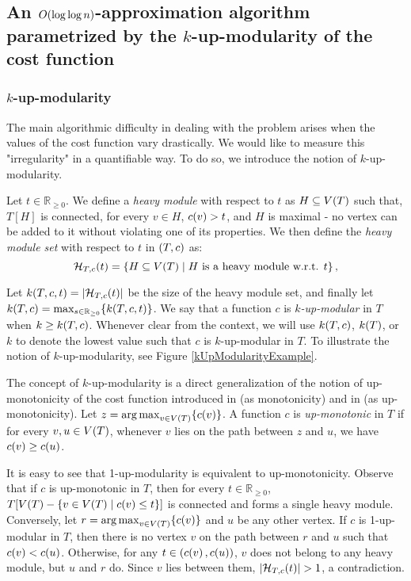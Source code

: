 

\subsection{An $O\mathopen{}\left( \log\log n \right)$-approximation algorithm parametrized by the $k$-up-modularity of the cost function}
\subsubsection{$k$-up-modularity}\label{kUpModularity}
The main algorithmic difficulty in dealing with the problem arises when the values of the cost function vary drastically. We would like to measure this "irregularity" in a quantifiable way. To do so, we introduce the notion of $k$-up-modularity.


Let $t\in\mathbb{R}_{\geq0}$. We define a \textit{heavy module} with respect to $t$ as $H\subseteq V\mathopen{}\left( T \right)$ such that, $T[H]$ is connected, for every $v \in H$, $c\mathopen{}\left( v \right) > t$, and $H$ is maximal - no vertex can be added to it without violating one of its properties. We then define the \textit{heavy module set} with respect to $t$ in $\mathopen{}\left( T,c \right)$ as:
$$
\mathcal{H}_{T,c}\mathopen{}\left( t \right)=\mathopen{}\left\{ H\subseteq V\mathopen{}\left( T \right)\mid H \text{ is a heavy module w.r.t. } t \right\},
$$

Let $k\mathopen{}\left( T,c, t \right) = \mathopen{}\left| \mathcal{H}_{T,c}\mathopen{}\left( t \right) \right|$ be the size of the heavy module set, and finally let $k\mathopen{}\left( T,c \right)= \max_{s\in\mathbb{R}_{\geq 0}}\mathopen{}\left\{ k\mathopen{}\left( T,c, t \right) \right\}$. We say that a function $c$ is $k$\textit{-up-modular} in $T$ when $k\geq k\mathopen{}\left( T,c \right)$. Whenever clear from the context, we will use $k\mathopen{}\left( T,c \right)$, $k\mathopen{}\left( T \right)$, or $k$ to denote the lowest value such that $c$ is $k$-up-modular in $T$. To illustrate the notion of $k$-up-modularity, see Figure \ref{kUpModularityExample}.

The concept of $k$-up-modularity is a direct generalization of the notion of up-monotonicity of the cost function introduced in \cite{dereniowski2022CFApproxAlgForBSInTsWithMonoQTimes} (as monotonicity) and in \cite{dereniowski2024SInTsMonoQTs} (as up-monotonicity). Let $z=\operatorname*{arg\,max}_{v\in V\mathopen{}\left( T \right)}\mathopen{}\left\{ c\mathopen{}\left( v \right) \right\}$. A function $c$ is \textit{up-monotonic} in $T$ if for every $v,u\in V\mathopen{}\left( T \right)$, whenever $v$ lies on the path between $z$ and $u$, we have $c\mathopen{}\left( v \right)\geq c\mathopen{}\left( u \right)$. 

It is easy to see that 1-up-modularity is equivalent to up-monotonicity. Observe that if $c$ is up-monotonic in $T$, then for every $t\in\mathbb{R}_{\geq 0}$, $T[V\mathopen{}\left( T \right)-\mathopen{}\left\{ v\in V\mathopen{}\left( T \right)\mid c\mathopen{}\left( v \right)\leq t \right\}]$ is connected and forms a single heavy module. Conversely, let $r=\operatorname*{arg\,max}_{v\in V\mathopen{}\left( T \right)}\mathopen{}\left\{ c\mathopen{}\left( v \right) \right\}$ and $u$ be any other vertex. If $c$ is 1-up-modular in $T$, then there is no vertex $v$ on the path between $r$ and $u$ such that $c\mathopen{}\left( v \right)<c\mathopen{}\left( u \right)$. Otherwise, for any $t\in \mathopen{}\left( c\mathopen{}\left( v \right),c\mathopen{}\left( u \right) \right)$, $v$ does not belong to any heavy module, but $u$ and $r$ do. Since $v$ lies between them, $\spr{\mathcal{H}_{T,c}\br{t}}>1$, a contradiction.


